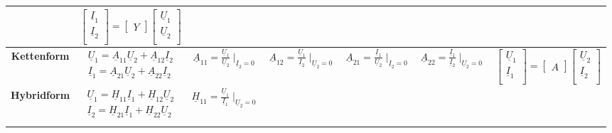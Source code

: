 \begin{table}
\begin{tabular}{| c | c | c | c | c | c | c |}
			&$ \begin{bmatrix}
					\underline{I}_{1}\\
					\underline{I}_{2}\\
				\end{bmatrix}
				=
				\begin{bmatrix}
					Y
				\end{bmatrix}
				\begin{bmatrix}
					\underline{U}_{1}\\
					\underline{U}_{2}\\
				\end{bmatrix}$\\
		\hline
			\textbf{Kettenform}
			& $ \begin{matrix}
					\underline{U}_{1}=\underline{A}_{11}\underline{U}_{2}+\underline{A}_{12}\underline{I}_{2}\\
					\underline{I}_{1}=\underline{A}_{21}\underline{U}_{2}+\underline{A}_{22}\underline{I}_{2}\\
				\end{matrix}$
			& $\underline{A}_{11}=\frac{\underline{U}_{1}}{\underline{U}_{2}} \mid_{\underline{I}_2=0}$
			& $\underline{A}_{12}=\frac{\underline{U}_{1}}{\underline{I}_{2}} \mid_{\underline{U}_2=0}$
			& $\underline{A}_{21}=\frac{\underline{I}_{1}}{\underline{U}_{2}} \mid_{\underline{I}_2=0}$
			& $\underline{A}_{22}=\frac{\underline{I}_{1}}{\underline{I}_{2}} \mid_{\underline{U}_2=0}$
			& $ \begin{bmatrix}
					\underline{U}_{1}\\
					\underline{I}_{1}\\
				\end{bmatrix}
				=
				\begin{bmatrix}
					A
				\end{bmatrix}
				\begin{bmatrix}
					\underline{U}_{2}\\
					\underline{I}_{2}\\
				\end{bmatrix}$\\
		\hline
			\textbf{Hybridform}
			& $ \begin{matrix}
					\underline{U}_{1}=\underline{H}_{11}\underline{I}_{1}+\underline{H}_{12}\underline{U}_{2}\\
					\underline{I}_{2}=\underline{H}_{21}\underline{I}_{1}+\underline{H}_{22}\underline{U}_{2}\\
				\end{matrix}$
			& $\underline{H}_{11}=\frac{\underline{U}_{1}}{\underline{I}_{1}} \mid_{\underline{U}_2=0}$

\end{tabular}
\end{table}
